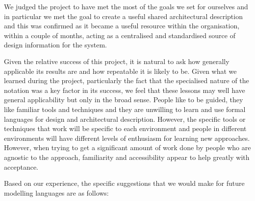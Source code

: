   We judged the project to have met the most of the goals we set for ourselves and in particular we met the goal to create a useful shared architectural description and this was confirmed as it became a useful resource within the organisation, within a couple of months, acting as a centralised and standardised source of design information for the system.

  Given the relative success of this project, it is natural to ask how generally applicable its results are and how repeatable it is likely to be.  Given what we learned during the project, particularly the fact that the specialised nature of the notation was a key factor in its success, we feel that these lessons may well have general applicability but only in the broad sense.  People like to be guided, they like familiar tools and techniques and they are unwilling to learn and use formal languages for design and architectural description.  However, the specific tools or techniques that work will be specific to each environment and people in different environments will have different levels of enthusiasm for learning new approaches.  However, when trying to get a significant amount of work done by people who are agnostic to the approach, familiarity and accessibility appear to help greatly with acceptance.

  Based on our experience, the specific suggestions that we would make for future modelling languages are as follows:

